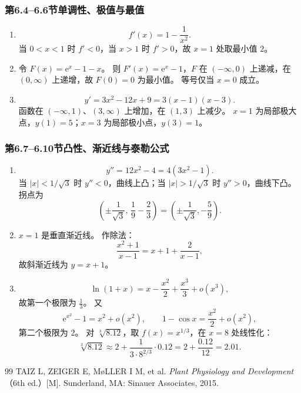 \documentclass[fontset=fandol]{ctexart}
\newcommand{\ee}{\mathrm{e}}
\begin{document}
\subsubsection*{第6.4--6.6节\quad 单调性、极值与最值}

\begin{enumerate}[label=\textbf{练习\arabic*.},leftmargin=2.2em]
\item
\[
f'(x)=1-\frac1{x^2}.
\]
当 $0<x<1$ 时 $f'<0$，当 $x>1$ 时 $f'>0$，故 $x=1$ 处取最小值 $2$。
\item 令 $F(x)=\ee^x-1-x$。 则 $F'(x)=\ee^x-1$，$F$ 在 $(-\infty,0)$ 上递减，在 $(0,\infty)$ 上递增，故 $F(0)=0$ 为最小值。 等号仅当 $x=0$ 成立。
\item
\[
y'=3x^2-12x+9=3(x-1)(x-3).
\]
函数在 $(-\infty,1)$、$(3,\infty)$ 上增加，在 $(1,3)$ 上减少。 $x=1$ 为局部极大点，$y(1)=5$；$x=3$ 为局部极小点，$y(3)=1$。
\end{enumerate}

\subsubsection*{第6.7--6.10节\quad 凸性、渐近线与泰勒公式}

\begin{enumerate}[label=\textbf{练习\arabic*.},leftmargin=2.2em]
\item
\[
y''=12x^2-4=4(3x^2-1).
\]
当 $|x|<1/\sqrt3$ 时 $y''<0$，曲线上凸；当 $|x|>1/\sqrt3$ 时 $y''>0$，曲线下凸。 拐点为
\[
\left(\pm\frac1{\sqrt3},\,\frac19-\frac23\right)=\left(\pm\frac1{\sqrt3},-\frac59\right).
\]
\item $x=1$ 是垂直渐近线。 作除法：
\[
\frac{x^2+1}{x-1}=x+1+\frac2{x-1},
\]
故斜渐近线为 $y=x+1$。
\item
\[
\ln(1+x)=x-\frac{x^2}{2}+\frac{x^3}{3}+o(x^3),
\]
故第一个极限为 $\frac13$。 又
\[
\ee^{x^2}-1=x^2+o(x^2),\qquad 1-\cos x=\frac{x^2}{2}+o(x^2),
\]
第二个极限为 $2$。 对 $\sqrt[3]{8.12}$，取 $f(x)=x^{1/3}$，在 $x=8$ 处线性化：
\[
\sqrt[3]{8.12}\approx2+\frac{1}{3\cdot 8^{2/3}}\cdot0.12=2+\frac{0.12}{12}=2.01.
\]
\end{enumerate}

\fi



\begin{thebibliography}{99}
 TAIZ L, ZEIGER E, M{\o}LLER I M, et al. \emph{Plant Physiology and Development}（6th ed.）[M]. Sunderland, MA: Sinauer Associates, 2015.
\end{thebibliography}
\end{document}
